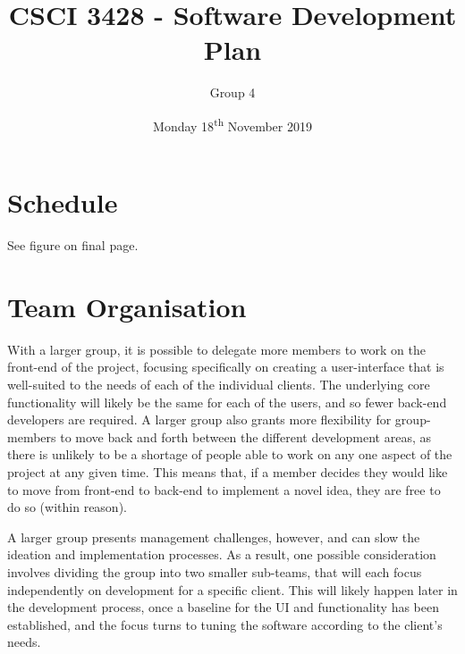 \documentclass[11pt]{article}
\renewcommand{\headrulewidth}{.3pt}
\renewcommand{\footrulewidth}{.3pt}
\begin{document}
\title{CSCI 3428 - Software Development Plan}
\author{Group 4}
\date{Monday 18\textsuperscript{th} November 2019}
\maketitle

\fancypagestyle{plain}{
\fancyhf{} %
\fancyfoot[r]{\footnotesize \thepage} %
\fancyfoot[l]{\small\scshape SDP} %
\renewcommand{\headrulewidth}{0pt}
\renewcommand{\footrulewidth}{.3pt}}

\section{Schedule}

See figure on final page.

\section{Team Organisation}
With a larger group, it is possible to delegate more members to work on the front-end of the project,
focusing specifically on creating a user-interface that is well-suited to the needs of each of the
individual clients. The underlying core functionality will likely be the same for each of the users,
and so fewer back-end developers are required. A larger group also grants more flexibility for
group-members to move back and forth between the different development areas, as there is unlikely
to be a shortage of people able to work on any one aspect of the project at any given time. This
means that, if a member decides they would like to move from front-end to back-end to implement a
novel idea, they are free to do so (within reason).

A larger group presents management challenges, however, and can slow the ideation and implementation
processes. As a result, one possible consideration involves dividing the group into two smaller
sub-teams, that will each focus independently on development for a specific client. This will likely
happen later in the development process, once a baseline for the UI and functionality has been
established, and the focus turns to tuning the software according to the client’s needs.
\end{document}
